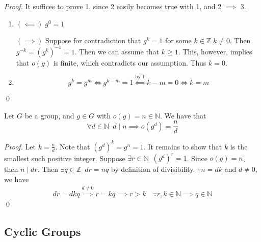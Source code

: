 \begin{proof}
  It suffices to prove 1, since 2 easily becomes true with 1, and 2 $\implies$ 3.

  \begin{enumerate}
    \item $(\impliedby) \; g^0 = 1$

      $(\implies)$ Suppose for contradiction that $g^k = 1$ for some $k \in \mathbb{Z} \; k \neq 0$. Then $g^{-k} = (g^k)^{-1} = 1$. Then we can assume that $k \geq 1$. This, however, implies that $o(g)$ is finite, which contradicts our assumption. Thus $k = 0$.

    \item \begin{equation*}
      g^k = g^m \iff g^{k - m} = 1 \overset{\text{by } 1}{\iff} k - m = 0 \iff k = m
    \end{equation*}
  \end{enumerate} \qed
\end{proof}

\begin{propo}
\label{propo:orders_of_powers_of_the_element}
  Let $G$ be a group, and $g \in G$ with $o(g) = n \in \mathbb{N}$. We have that
  \begin{equation*}
    \forall d \in \mathbb{N} \enspace d \; | \; n \implies o(g^d) = \frac{n}{d}
  \end{equation*}
\end{propo}

\begin{proof}
  Let $k = \frac{n}{d}$. Note that $(g^d)^k = g^n = 1$. It remains to show that $k$ is the smallest such positive integer. Suppose $\exists r \in \mathbb{N} \enspace (g^d)^r = 1$. Since $o(g) = n$, then $n \; | \; dr$. Then $\exists q \in \mathbb{Z} \enspace dr = nq$ by definition of divisibility. $\because n = dk$ and $d \neq 0$, we have
  \begin{align*}
    dr = dkq \overset{d \neq 0}{\implies} r = kq \implies r > k \quad \because r, k \in \mathbb{N} \implies q \in \mathbb{N}
  \end{align*}\qed
\end{proof}


\subsection{Cyclic Groups}%
\label{sub:cyclic_groups}

